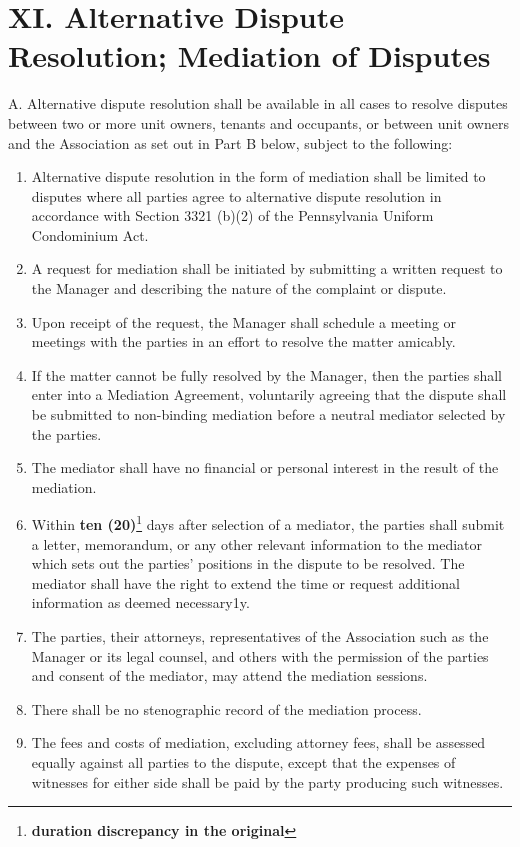 \documentclass[
]{book}
\begin{document}
\hypertarget{xi.-alternative-dispute-resolution-mediation-of-disputes-2}{%
\section*{XI. Alternative Dispute Resolution; Mediation of Disputes}\label{xi.-alternative-dispute-resolution-mediation-of-disputes-2}}

A. Alternative dispute resolution shall be available in all cases to resolve disputes between two or more unit owners, tenants and occupants, or between unit owners and the Association as set out in Part B below, subject to the following:

\begin{enumerate}
\def\labelenumi{\arabic{enumi}.}
\item
  Alternative dispute resolution in the form of mediation shall be limited to disputes where all parties agree to alternative dispute resolution in accordance with Section 3321 (b)(2) of the Pennsylvania Uniform Condominium Act.
\item
  A request for mediation shall be initiated by submitting a written request to the Manager and describing the nature of the complaint or dispute.
\item
  Upon receipt of the request, the Manager shall schedule a meeting or meetings with the parties in an effort to resolve the matter amicably.
\item
  If the matter cannot be fully resolved by the Manager, then the parties shall enter into a Mediation Agreement, voluntarily agreeing that the dispute shall be submitted to non-binding mediation before a neutral mediator selected by the parties.
\item
  The mediator shall have no financial or personal interest in the result of the mediation.
\item
  Within \textbf{ten (20)}\footnote{\textbf{duration discrepancy in the original}} days after selection of a mediator, the parties shall submit a letter, memorandum, or any other relevant information to the mediator which sets out the parties' positions in the dispute to be resolved. The mediator shall have the right to extend the time or request additional information as deemed necessary1y.
\item
  The parties, their attorneys, representatives of the Association such as the Manager or its legal counsel, and others with the permission of the parties and consent of the mediator, may attend the mediation sessions.
\item
  There shall be no stenographic record of the mediation process.
\item
  The fees and costs of mediation, excluding attorney fees, shall be assessed equally against all parties to the dispute, except that the expenses of witnesses for either side shall be paid by the party producing such witnesses.
\end{enumerate}
\end{document}
